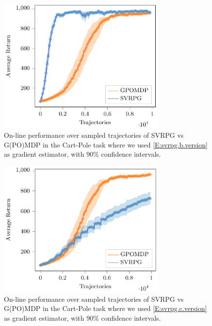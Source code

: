 \begin{figure}[h]
	\begin{minipage}[h]{1\textwidth}
		\centering
		\includegraphics[width=0.75\textwidth]{Images/Experiments/cart_pole_GPOMDP_vs_SVRPG_B_reuse.pdf}
		\vspace{-0.1in}
		\caption{On-line performance over sampled trajectories of \acs{SVRPG} vs G(PO)MDP in the Cart-Pole task where we used \ref{E:svrpg.b.version} as gradient estimator, with 90\% confidence intervals.}
		\label{fig:cartpole2}
	\end{minipage}
	\vspace{-0.15in}
\end{figure}
\begin{figure}[h]
	\begin{minipage}[h]{1\textwidth}
		\centering
		\includegraphics[width=0.75\textwidth]{Images/Experiments/cart_pole_GPOMDP_vs_SVRPG_C.pdf}
		\vspace{-0.1in}
		\caption{On-line performance over sampled trajectories of \acs{SVRPG} vs G(PO)MDP in the Cart-Pole task where we used \ref{E:svrpg.c.version} as gradient estimator, with 90\% confidence intervals.}
		\label{fig:cartpole3}
	\end{minipage}
	\vspace{-0.15in}
\end{figure}
